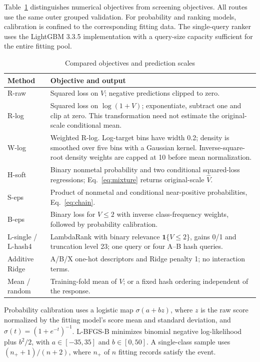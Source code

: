 Table~\ref{tab:routes} distinguishes numerical objectives from screening objectives. All routes use the same outer grouped validation. For probability and ranking models, calibration is confined to the corresponding fitting data. The single-query ranker uses the LightGBM 3.3.5 implementation with a query-size capacity sufficient for the entire fitting pool.
\par
\begin{table}[H]
\centering
\caption{Compared objectives and prediction scales}\label{tab:routes}
\begin{tabularx}{\linewidth}{@{}l X@{}}
\toprule
Method & Objective and output\\
\midrule
R-raw & Squared loss on $V$; negative predictions clipped to zero.\\
R-log & Squared loss on $\log(1+V)$; exponentiate, subtract one and clip at zero. This transformation need not estimate the original-scale conditional mean.\\
W-log & Weighted R-log. Log-target bins have width 0.2; density is smoothed over five bins with a Gaussian kernel. Inverse-square-root density weights are capped at 10 before mean normalization.\\
H-soft & Binary nonmetal probability and two conditional squared-loss regressions; Eq.~\eqref{eq:mixture} returns original-scale $\widehat V$.\\
S-eps & Product of nonmetal and conditional near-positive probabilities, Eq.~\eqref{eq:chain}.\\
B-eps & Binary loss for $V\le2$ with inverse class-frequency weights, followed by probability calibration.\\
L-single / L-hash4 & LambdaRank with binary relevance $\mathbf{1}\{V\le2\}$, gains 0/1 and truncation level 23; one query or four A--B hash queries.\\
Additive Ridge & A/B/X one-hot descriptors and Ridge penalty 1; no interaction terms.\\
Mean / random & Training-fold mean of $V$; or a fixed hash ordering independent of the response.\\
\bottomrule
\end{tabularx}
\end{table}
\par
Probability calibration uses a logistic map $\sigma(a+bz)$, where $z$ is the raw score normalized by the fitting model's score mean and standard deviation, and $\sigma(t)=(1+e^{-t})^{-1}$. L-BFGS-B minimizes binomial negative log-likelihood plus $b^2/2$, with $a\in[-35,35]$ and $b\in[0,50]$. A single-class sample uses $(n_++1)/(n+2)$, where $n_+$ of $n$ fitting records satisfy the event.
\FloatBarrier

